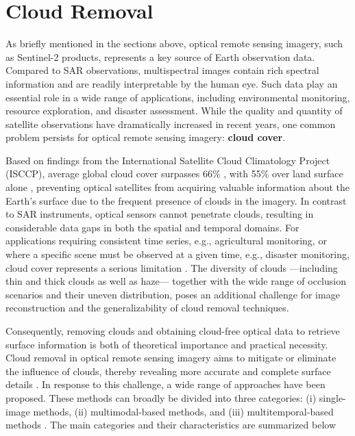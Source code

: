 \section{Cloud Removal}
As briefly mentioned in the sections above, optical remote sensing imagery, such as Sentinel-2 products, represents a key source of Earth observation data. Compared to SAR observations, multispectral images contain rich spectral information and are readily interpretable by the human eye. Such data play an essential role in a wide range of applications, including environmental monitoring, resource exploration, and disaster assessment. While the quality and quantity of satellite observations have dramatically increased in recent years, one common problem persists for optical remote sensing imagery: \textbf{cloud cover}.

Based on findings from the International Satellite Cloud Climatology Project (ISCCP), average global cloud cover surpasses 66\% \cite{dl_cloud_detection_survey,aCGAN_fuse_sar_MS,CR_SEN2_dRNN}, with 55\% over land surface alone \cite{CR_SEN2_dRNN}, preventing optical satellites from acquiring valuable information about the Earth's surface due to the frequent presence of clouds in the imagery. In contrast to SAR instruments, optical sensors cannot penetrate clouds, resulting in considerable data gaps in both the spatial and temporal domains. For applications requiring consistent time series, e.g., agricultural monitoring, or where a specific scene must be observed at a given time, e.g., disaster monitoring, cloud cover represents a serious limitation \cite{CR_SEN2_dRNN}. The diversity of clouds —including thin and thick clouds as well as haze— together with the wide range of occlusion scenarios and their uneven distribution, poses an additional challenge for image reconstruction and the generalizability of cloud removal techniques\cite{CR_Advances_Review_ORS}.

Consequently, removing clouds and obtaining cloud-free optical data to retrieve surface information is both of theoretical importance and practical necessity. Cloud removal in optical remote sensing imagery aims to mitigate or eliminate the influence of clouds, thereby revealing more accurate and complete surface details \cite{CR_Advances_Review_ORS}. In response to this challenge, a wide range of approaches have been proposed. These methods can broadly be divided into three categories: (i) single-image methods, (ii) multimodal-based methods, and (iii) multitemporal-based methods \cite{CR_Advances_Review_ORS}. The main categories and their characteristics are summarized below

